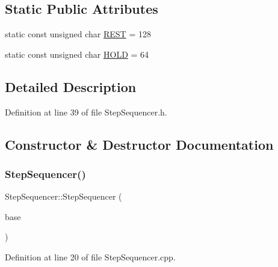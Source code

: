 \subsection*{Static Public Attributes}
\begin{DoxyCompactItemize}
\item 
static const unsigned char \hyperlink{class_step_sequencer_a2bba012830137ec08afb83cf5da1d799}{R\+E\+ST} = 128
\item 
static const unsigned char \hyperlink{class_step_sequencer_ac1b02d103d79f819639067c5ef5e6803}{H\+O\+LD} = 64
\end{DoxyCompactItemize}


\subsection{Detailed Description}


Definition at line 39 of file Step\+Sequencer.\+h.



\subsection{Constructor \& Destructor Documentation}
\mbox{\label{class_step_sequencer_a552647854b6f7c5d653432774c357f3e}} 
\subsubsection{\texorpdfstring{Step\+Sequencer()}{StepSequencer()}}
{\footnotesize\ttfamily Step\+Sequencer\+::\+Step\+Sequencer (\begin{DoxyParamCaption}\item[{\hyperlink{class_step_sequencer_base}{Step\+Sequencer\+Base} $\ast$}]{base }\end{DoxyParamCaption})}



Definition at line 20 of file Step\+Sequencer.\+cpp.

